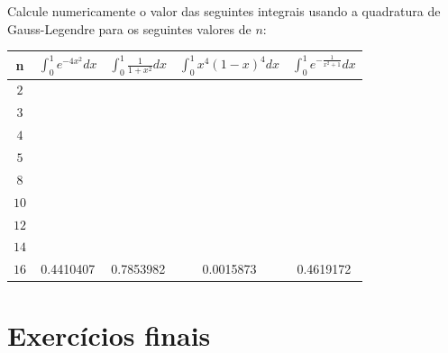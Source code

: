 \begin{Exercise}Calcule numericamente o valor das seguintes integrais usando a quadratura de Gauss-Legendre para os seguintes valores de $n$:
\begin{center}
\begin{tabular}{|c|c|c|c|c|}
\hline
n   & $\int_{0}^1e^{-4x^2}dx$ & $\int_{0}^1\frac{1}{1+x^2}dx$ & $\int_{0}^1x^4(1-x)^4dx$ & $\int_{0}^1e^{-\frac{1}{x^2+1}}dx$  \\
\hline
$2$ & ~\hspace{40pt}~& & ~\hspace{40pt}~& ~\hspace{40pt}~\\
\hline
$3$ && && \\
\hline
$4 $  & &      & & \\
\hline
$5 $  & &      & & \\
\hline
$8 $  & &   & &\\
\hline
$10$   & &  & &\\
\hline
$12$   & &  & &\\
\hline
$14$   & & & &\\
\hline
$16$   &0.4410407  &0.7853982 &0.0015873 & 0.4619172 \\
\hline
\end{tabular}
\end{center}
\end{Exercise}

\section{Exercícios finais}



